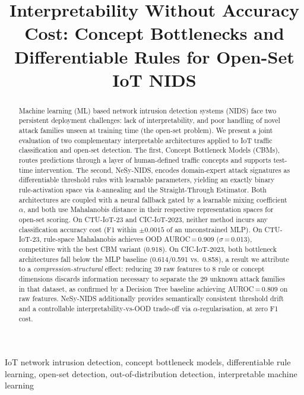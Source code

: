 \documentclass[conference]{IEEEtran}
\title{Interpretability Without Accuracy Cost: Concept Bottlenecks and
Differentiable Rules for Open-Set IoT NIDS}
\author{%
  \IEEEauthorblockN{Ngari Crisphine Macharia}
  \IEEEauthorblockA{Department of Electrical and Computer Engineering\\
  Southern Illinois University Carbondale\\
  c.ngari@siu.edu}
  \and
  \IEEEauthorblockN{Ning Weng}
  \IEEEauthorblockA{Department of Electrical and Computer Engineering\\
  Southern Illinois University Carbondale\\
  nweng@siu.edu}
}
\begin{document}
\maketitle

\begin{abstract}
Machine learning (ML) based network intrusion detection systems (NIDS) face
two persistent deployment challenges: lack of interpretability, and poor
handling of novel attack families unseen at training time (the open-set
problem). We present a joint evaluation of two complementary interpretable
architectures applied to IoT traffic classification and open-set detection.
The first, Concept Bottleneck Models (CBMs), routes predictions through a
layer of human-defined traffic concepts and supports test-time intervention.
The second, NeSy-NIDS, encodes domain-expert attack signatures as
differentiable threshold rules with learnable parameters, yielding an
exactly binary rule-activation space via $k$-annealing and the
Straight-Through Estimator. Both architectures are coupled with a
neural fallback gated by a learnable mixing coefficient $\alpha$, and both
use Mahalanobis distance in their respective representation spaces for
open-set scoring. On CTU-IoT-23 and CIC-IoT-2023, neither method incurs
any classification accuracy cost (F1 within $\pm0.0015$ of an unconstrained
MLP). On CTU-IoT-23, rule-space Mahalanobis achieves OOD AUROC\,=\,0.909
($\sigma$\,=\,0.013), competitive with the best CBM variant (0.918). On
CIC-IoT-2023, both bottleneck architectures fall below the MLP baseline
(0.614/0.591 vs.\ 0.858), a result we attribute to a \emph{compression-structural}
effect: reducing 39 raw features to 8 rule or concept dimensions discards
information necessary to separate the 29 unknown attack families in that
dataset, as confirmed by a Decision Tree baseline achieving AUROC\,=\,0.809
on raw features. NeSy-NIDS additionally provides semantically consistent
threshold drift and a controllable interpretability-vs-OOD trade-off via
$\alpha$-regularisation, at zero F1 cost.
\end{abstract}

\begin{IEEEkeywords}
IoT network intrusion detection, concept bottleneck models, differentiable
rule learning, open-set detection, out-of-distribution detection,
interpretable machine learning
\end{IEEEkeywords}

\end{document}
